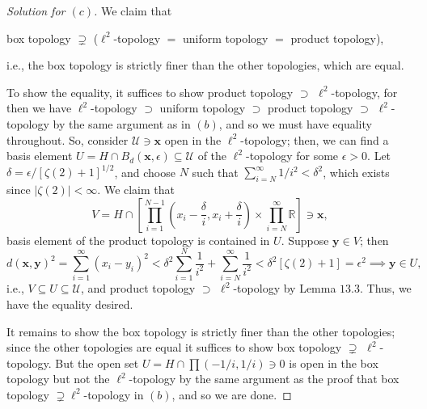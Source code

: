 \documentclass[12pt]{article}
\theoremstyle{remark}
\begin{document}
\begin{proof}[Solution for $(c)$]
  We claim that
  \begin{center}
    box topology $\supsetneq$ ($\ell^2$-topology $=$ uniform topology $=$ product topology),
  \end{center}
  i.e., the box topology is strictly finer than the other topologies, which are equal.
  \par To show the equality, it suffices to show product topology $\supset$ $\ell^2$-topology, for then we have $\ell^2$-topology $\supset$ uniform topology $\supset$ product topology $\supset$ $\ell^2$-topology by the same argument as in $(b)$, and so we must have equality throughout. So, consider $\mathcal{U} \ni \mathbf{x}$ open in the $\ell^2$-topology; then, we can find a basis element $U = H \cap B_d(\mathbf{x},\epsilon) \subseteq \mathcal{U}$ of the $\ell^2$-topology for some $\epsilon > 0$. Let $\delta = \epsilon/[\zeta(2)+1]^{1/2}$, and choose $N$ such that $\sum_{i=N}^\infty 1/i^2 < \delta^2$, which exists since $|\zeta(2)| < \infty$. We claim that
  \begin{equation*}
    V = H \cap \left[\prod_{i=1}^{N-1} \left(x_i-\frac{\delta}{i},x_i+\frac{\delta}{i}\right) \times \prod_{i=N}^\infty \mathbb{R}\right] \ni \mathbf{x},
  \end{equation*}
  basis element of the product topology is contained in $U$. Suppose $\mathbf{y} \in V$; then
  \begin{equation*}
    d(\mathbf{x},\mathbf{y})^2 = \sum_{i=1}^\infty (x_i-y_i)^2 < \delta^2 \sum_{i=1}^N \frac{1}{i^2} + \sum_{i=N}^\infty \frac{1}{i^2} < \delta^2[\zeta(2)+1] = \epsilon^2 \implies \mathbf{y} \in U,
  \end{equation*}
  i.e., $V \subseteq U \subseteq \mathcal{U}$, and product topology $\supset$ $\ell^2$-topology by Lemma $13.3$. Thus, we have the equality desired.
  \par It remains to show the box topology is strictly finer than the other topologies; since the other topologies are equal it suffices to show box topology $\supsetneq$ $\ell^2$-topology. But the open set $U = H \cap \prod (-1/i,1/i) \ni 0$ is open in the box topology but not the $\ell^2$-topology by the same argument as the proof that box topology $\supsetneq \ell^2$-topology in $(b)$, and so we are done.
\end{proof}
\end{document}
